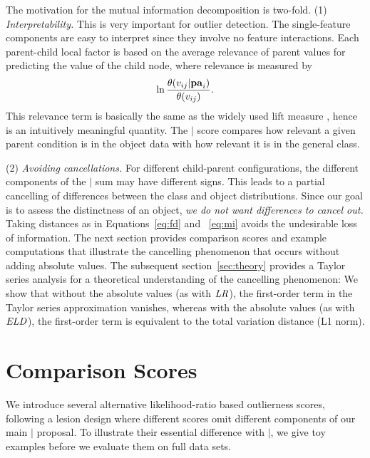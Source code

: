 {The motivation for the mutual information decomposition is two-fold. 
(1) {\em Interpretability.} This is very important for outlier detection. The single-feature components are easy to interpret since they involve no feature interactions. Each parent-child local factor is based on the average relevance of parent values for predicting the value of the child node, where relevance is measured by $$\ln \frac{\theta(v_{ij}|\mathbf{pa}_{i})}{\theta(v_{ij})}.$$ This relevance term  is basically the same as the widely used lift measure \citep{Tuffery2011}, hence is an intuitively meaningful quantity. The $\mid$ score compares how relevant a given parent condition is in the object data with how relevant it is in the general class. 


(2) {\em Avoiding cancellations.} 
For different child-parent configurations, the different components of the $\mid$ sum may have different signs. This leads to a partial cancelling of differences between the class and object distributions. Since our goal is to assess the distinctness of an object, {\em we do not want differences to cancel out.} Taking distances as in Equations~\eqref{eq:fd} and ~\eqref{eq:mi} avoids the undesirable loss of information. 
The next section provides comparison scores and example computations that illustrate the cancelling phenomenon that occurs without adding absolute values. The subsequent section~\ref{sec:theory} provides a Taylor series analysis for a theoretical understanding of the cancelling phenomenon: We show that without the absolute values (as with $\it{LR}$), the first-order term in the Taylor series approximation vanishes, whereas with the absolute values (as with $\it{ELD}$), the first-order term is equivalent to the total variation distance (L1 norm). 

\section{Comparison Scores} \label{sec:metrics}

We introduce several alternative likelihood-ratio based outlierness scores, following a lesion design where different scores omit different components of our main $\mid$ proposal. %
To illustrate their essential difference with $\mid$, we give toy examples before we evaluate them on full data sets.

}
